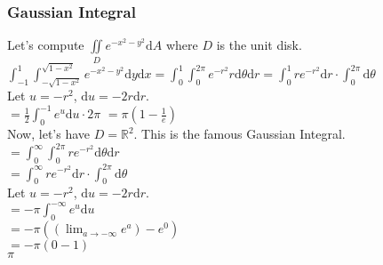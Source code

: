 \subsubsection{Gaussian Integral}
\noindent
Let's compute $\iint\limits_{D}{e^{-x^2-y^2}\mathrm{d}A}$ where $D$ is the unit disk.\\
\indent
$\int_{-1}^{1}{\int_{-\sqrt{1-x^2}}^{\sqrt{1-x^2}}{e^{-x^2-y^2}\mathrm{d}y}\mathrm{d}x}=\int_{0}^{1}{\int_{0}^{2\pi}{e^{-r^2}r\mathrm{d}\theta}\mathrm{d}r}=\int_{0}^{1}{re^{-r^2}\mathrm{d}r}\cdot\int_{0}^{2\pi}{\mathrm{d}\theta}$\\
\indent
Let $u=-r^2$, $\mathrm{d}u=-2r\mathrm{d}r$.\\
\indent
$=\frac{1}{2}\int_{0}^{-1}{e^u\mathrm{d}u}\cdot 2\pi$
\indent
$=\pi\left(1-\frac{1}{e}\right)$\\
Now, let's have $D=\mathbb{R}^2$. This is the famous Gaussian Integral.\\
\indent
$=\int_{0}^{\infty}{\int_{0}^{2\pi}{re^{-r^2}\mathrm{d}\theta}\mathrm{d}r}$\\
\indent
$=\int_{0}^{\infty}{re^{-r^2}\mathrm{d}r}\cdot\int_{0}^{2\pi}{\mathrm{d}\theta}$\\
\indent
Let $u=-r^2$, $\mathrm{d}u=-2r\mathrm{d}r$.\\
\indent
$=-\pi\int_{0}^{-\infty}{e^{u}\mathrm{d}u}$\\
\indent
$=-\pi\left(\left(\lim_{a\to -\infty}{e^{a}}\right)-e^0\right)$\\
\indent
$=-\pi\left(0-1\right)$\\
\indent
$\pi$\\
